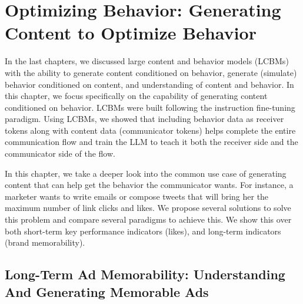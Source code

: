 \chapter{Optimizing Behavior: Generating Content to Optimize Behavior}
\label{chatper:Generating Content Leading to Optimal Behavior}


In the last chapters, we discussed large content and behavior models (LCBMs) with the ability to generate content conditioned on behavior, generate (simulate) behavior conditioned on content, and understanding of content and behavior. In this chapter, we focus specifically on the capability of generating content conditioned on behavior. LCBMs were built following the instruction fine-tuning paradigm. Using LCBMs, we showed that including behavior data as receiver tokens along with content data (communicator tokens) helps complete the entire communication flow and train the LLM to teach it both the receiver side and the communicator side of the flow. 


In this chapter, we take a deeper look into the common use case of generating content that can help get the behavior the communicator wants. For instance, a marketer wants to write emails or compose tweets that will bring her the maximum number of link clicks and likes. We propose several solutions to solve this problem and compare several paradigms to achieve this. We show this over both short-term key performance indicators (likes), and long-term indicators (brand memorability). 


\section{Long-Term Ad Memorability: Understanding And Generating Memorable Ads}

